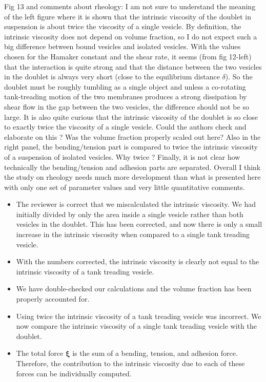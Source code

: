 \documentclass[11pt]{article}
\newcommand{\comment}[1]{{\color{blue} #1}}
\newcommand{\xxi}{\boldsymbol{\xi}}
\begin{document}
\noindent
\comment{Fig 13 and comments about rheology: I am not sure to understand
the meaning of the left figure where it is shown that the intrinsic
viscosity of the doublet in suspension is about twice the viscosity of a
single vesicle. By definition, the intrinsic viscosity does not depend
on volume fraction, so I do not expect such a big difference between
bound vesicles and isolated vesicles. With the values chosen for the
Hamaker constant and the shear rate, it seems (from fig 12-left) that
the interaction is quite strong and that the distance between the two
vesicles in the doublet is always very short (close to the equilibrium
distance $\delta$). So the doublet must be roughly tumbling as a single
object and unless a co-rotating tank-treading motion of the two
membranes produces a strong dissipation by shear flow in the gap between
the two vesicles, the difference should not be so large. It is also
quite curious that the intrinsic viscosity of the doublet is so close to
exactly twice the viscosity of a single vesicle. Could the authors check
and elaborate on this ? Was the volume fraction properly scaled out
here? Also in the right panel, the bending/tension part is compared to
twice the intrinsic viscosity of a suspension of isolated vesicles. Why
twice ? Finally, it is not clear how technically the bending/tension and
adhesion parts are separated.  Overall I think the study on rheology
needs much more development than what is presented here with only one
set of parameter values and very little quantitative comments.}
\begin{itemize}
  \item The reviewer is correct that we miscalculated the intrinsic
    viscosity.  We had initially divided by only the area inside a
    single vesicle rather than both vesicles in the doublet.  This has
    been corrected, and now there is only a small increase in the
    intrinsic viscosity when compared to a single tank treading vesicle.

  \item With the numbers corrected, the intrinsic viscosity is clearly
    not equal to the intrinsic viscosity of a tank treading vesicle.

  \item We have double-checked our calculations and the volume fraction
    has been properly accounted for.

  \item Using twice the intrinsic viscosity of a tank treading vesicle
    was incorrect.  We now compare the intrinsic viscosity of a single
    tank treading vesicle with the doublet.

  \item The total force $\xxi$ is the sum of a bending, tension, and
    adhesion force.  Therefore, the contribution to the intrinsic
    viscosity due to each of these forces can be individually computed.
\end{itemize}
\end{document}
